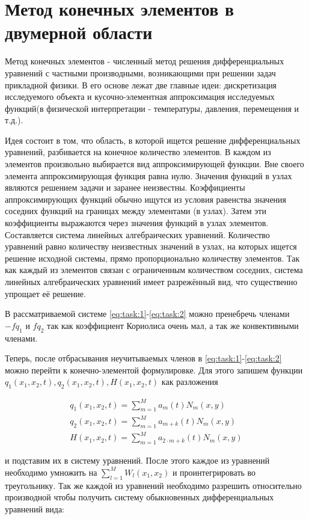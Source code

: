 \documentclass[14pt]{extreport}
\begin{document}
\section{Метод конечных элементов в двумерной области}

Метод конечных элементов \cite{bib:fem:pankratov, bib:fem:zenkevich} - численный метод решения дифференциальных уравнений с частными производными, возникающими при решении задач прикладной физики.
	В его основе лежат две главные идеи: дискретизация исследуемого объекта и кусочно-элементная аппроксимация исследуемых функций(в физической интерпретации - температуры, давления, перемещения и т.д.).

Идея состоит в том, что область, в которой ищется решение дифференциальных уравнений, разбивается на конечное количество элементов. В каждом из элементов произвольно выбирается вид аппроксимирующей функции. Вне своего элемента аппроксимирующая функция равна нулю. Значения функций в узлах являются решением задачи и заранее неизвестны. Коэффициенты аппроксимирующих функций обычно ищутся из условия равенства значения соседних функций на границах между элементами (в узлах). Затем эти коэффициенты выражаются через значения функций в узлах элементов. Составляется система линейных алгебраических уравнений. Количество уравнений равно количеству неизвестных значений в узлах, на которых ищется решение исходной системы, прямо пропорционально количеству элементов. Так как каждый из элементов связан с ограниченным количеством соседних, система линейных алгебраических уравнений имеет разрежённый вид, что существенно упрощает её решение. 


В рассматриваемой системе \ref{eq:task:1}-\ref{eq:task:2} можно пренебречь членами $-fq_{1}$ и $fq_2$ так как коэффициент Кориолиса очень мал, а так же конвективными членами.

Теперь, после отбрасывания неучитываемых членов в \ref{eq:task:1}-\ref{eq:task:2} можно перейти к конечно-элементой формулировке. Для этого запишем функции $q_1(x_1, x_2,t) , q_2(x_1, x_2,t), H(x_1, x_2,t)$ как разложения


\begin{eqnarray}\label{eq:fem:1}
q_1(x_1, x_2, t) = \sum\limits_{m=1}^{M} a_m(t)N_m(x, y) \\
q_2(x_1, x_2, t) = \sum\limits_{m=1}^{M} a_{m+k}(t)N_m(x, y) \\
H(x_1, x_2, t) = \sum\limits_{m=1}^{M} a_{2\cdot m+k}(t)N_m(x, y)
\end{eqnarray}


\noindent и подставим их в систему уравнений. После этого каждое из уравнений необходимо умножить на $\sum\limits_{l=1}^{M} W_l(x_1, x_2)$ и проинтегрировать во треугольнику. Так же каждой из уравнений необходимо разрешить относительно производной чтобы получить систему обыкновенных дифференциальных уравнений вида:
\end{document}

